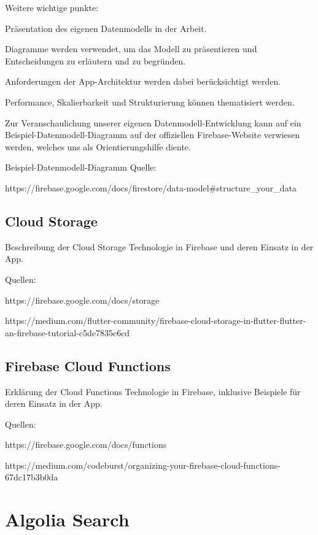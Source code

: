 Weitere wichtige punkte:

\begin{compactitem}
    \item Präsentation des eigenen Datenmodells in der Arbeit.
    \item Diagramme werden verwendet, um das Modell zu präsentieren und Entscheidungen zu erläutern und zu begründen.
    \item Anforderungen der App-Architektur werden dabei berücksichtigt werden.
    \item Performance, Skalierbarkeit und Strukturierung können thematisiert werden.
    \item Zur Veranschaulichung unserer eigenen Datenmodell-Entwicklung kann auf ein Beispiel-Datenmodell-Diagramm auf der offiziellen Firebase-Website verwiesen werden, welches uns als Orientierungshilfe diente.
\end{compactitem}

Beispiel-Datenmodell-Diagramm Quelle: 

https://firebase.google.com/docs/firestore/data-model\#structure\_your\_data

\subsection{Cloud Storage}

Beschreibung der Cloud Storage Technologie in Firebase und deren Einsatz in der App.

Quellen: 

https://firebase.google.com/docs/storage 

https://medium.com/flutter-community/firebase-cloud-storage-in-flutter-flutter-an-firebase-tutorial-c5de7835c6cd

\subsection{Firebase Cloud Functions}

Erklärung der Cloud Functions Technologie in Firebase, inklusive Beispiele für deren Einsatz in der App.

Quellen: 

https://firebase.google.com/docs/functions 

https://medium.com/codeburst/organizing-your-firebase-cloud-functions-67dc17b3b0da

\section{Algolia Search}


